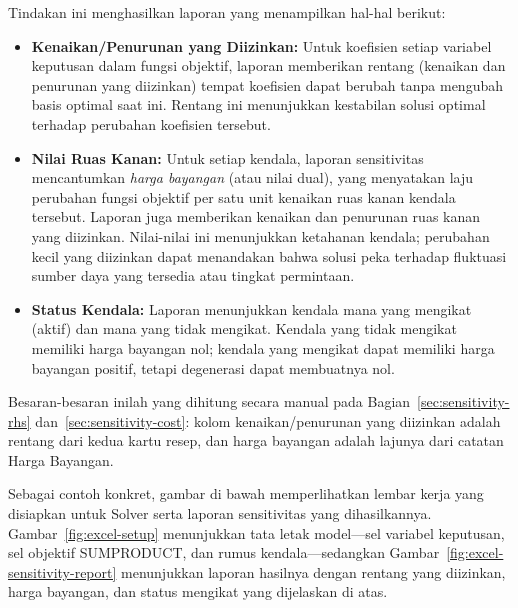 \begin{center}
\par{}\label{fig:excel-sensitivity}%

\end{center}
Tindakan ini menghasilkan laporan yang menampilkan hal-hal berikut:
\begin{itemize}
\item \textbf{Kenaikan/Penurunan yang Diizinkan:} Untuk koefisien setiap variabel keputusan dalam fungsi objektif, laporan memberikan rentang (kenaikan dan penurunan yang diizinkan) tempat koefisien dapat berubah tanpa mengubah basis optimal saat ini. Rentang ini menunjukkan kestabilan solusi optimal terhadap perubahan koefisien tersebut.

\item \textbf{Nilai Ruas Kanan:} Untuk setiap kendala, laporan sensitivitas mencantumkan \emph{harga bayangan} (atau nilai dual), yang menyatakan laju perubahan fungsi objektif per satu unit kenaikan ruas kanan kendala tersebut. Laporan juga memberikan kenaikan dan penurunan ruas kanan yang diizinkan. Nilai-nilai ini menunjukkan ketahanan kendala; perubahan kecil yang diizinkan dapat menandakan bahwa solusi peka terhadap fluktuasi sumber daya yang tersedia atau tingkat permintaan.

\item \textbf{Status Kendala:} Laporan menunjukkan kendala mana yang mengikat (aktif) dan mana yang tidak mengikat. Kendala yang tidak mengikat memiliki harga bayangan nol; kendala yang mengikat dapat memiliki harga bayangan positif, tetapi degenerasi dapat membuatnya nol.
\end{itemize}

Besaran-besaran inilah yang dihitung secara manual pada Bagian~\ref{sec:sensitivity-rhs} dan~\ref{sec:sensitivity-cost}: kolom kenaikan/penurunan yang diizinkan adalah rentang dari kedua kartu resep, dan harga bayangan adalah lajunya dari catatan Harga Bayangan.

Sebagai contoh konkret, gambar di bawah memperlihatkan lembar kerja yang disiapkan
untuk Solver serta laporan sensitivitas yang dihasilkannya. Gambar~\ref{fig:excel-setup}
menunjukkan tata letak model---sel variabel keputusan, sel objektif SUMPRODUCT, dan
rumus kendala---sedangkan Gambar~\ref{fig:excel-sensitivity-report} menunjukkan
laporan hasilnya dengan rentang yang diizinkan, harga bayangan, dan status mengikat
yang dijelaskan di atas.

